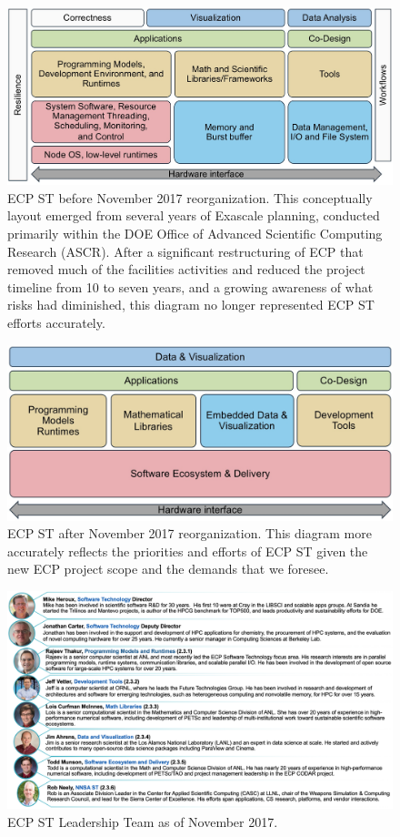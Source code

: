 \begin{figure}
	\centering
	\includegraphics[width=0.9\linewidth]{ECPSTV1}
	\caption{ECP ST before November 2017 reorganization.  This conceptually layout emerged from several years of Exascale planning, conducted primarily within the DOE Office of Advanced Scientific Computing Research (ASCR).  After a significant restructuring of ECP that removed much of the facilities activities and reduced the project timeline from 10 to seven years, and a growing awareness of what risks had diminished, this diagram no longer represented ECP ST efforts accurately.}
	\label{fig:ecpstv1}
\end{figure}
\begin{figure}
	\centering
	\includegraphics[width=0.9\linewidth]{ECPSTV2}
	\caption{ECP ST after November 2017 reorganization.  This diagram more accurately reflects the priorities and efforts of ECP ST given the new ECP project scope and the demands that we foresee.}
	\label{fig:expstv2}
\end{figure}
\begin{figure}
	\centering
	\includegraphics[width=0.9\linewidth]{ECP-ST-Leads}
	\caption{ECP ST Leadership Team as of November 2017.}
	\label{fig:ecpstleads}
\end{figure}

